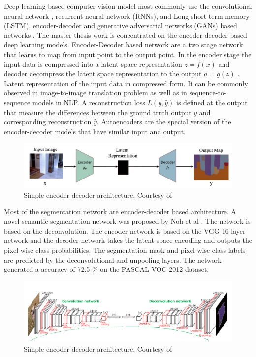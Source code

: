     Deep learning based computer vision model most commonly use the convolutional neural network \cite{61_chen2017rethinking}, recurrent neural network (RNNs), and Long short term memory (LSTM), encoder-decoder \cite{62_badrinarayanan2017segnet} and generative adversarial networks (GANs) based networks \cite{60_minaee2021image}. The master thesis work is concentrated on the encoder-decoder based deep learning models. Encoder-Decoder based network are a two stage network that learns to map from input point to the output point. In the encoder stage the input data is compressed into a latent space representation $ z = f(x)$ and decoder decompress the latent space representation to the output $ a = g(z)$ \cite{63_goodfellow2014generative}. Latent representation of the input data in compressed form. It can be commonly observed in image-to-image translation problem as well as in sequence-to-sequence models in NLP. A reconstruction loss $ L(y, \hat{y})$ is defined at the output that measure the differences between the ground truth output $y$ and corresponding reconstruction $\hat{y}$. Autoencoders are the special version of the encoder-decoder models that have similar input and output.
    
    \begin{figure}[h]
    	\centering
    	\includegraphics[width=14cm]{images/en_de.png}
    	\caption{Simple encoder-decoder architecture. Courtesy of \cite{60_minaee2021image}}
    	\label{fig:en_de}
    \end{figure} 		
    
    Most of the segmentation network are encoder-decoder based architecture. A novel semantic segmentation network was proposed by Noh et al \cite{64_noh2015learning}. The network is based on the deconvolution. The encoder network is based on the VGG 16-layer network and the decoder network takes the latent space encoding and outputs the pixel wise class probabilities. The segmentation mask and pixel-wise class labels are predicted by the deconvolutional and unpooling layers. The network generated a accuracy of 72.5 \% on the PASCAL VOC 2012 dataset. 
    
    \begin{figure}[h]
    	\centering
    	\includegraphics[width=14cm]{images/general_seg.png}
    	\caption{Simple encoder-decoder architecture. Courtesy of \cite{64_noh2015learning}}
    	\label{fig:general_seg}
    \end{figure} 
    
